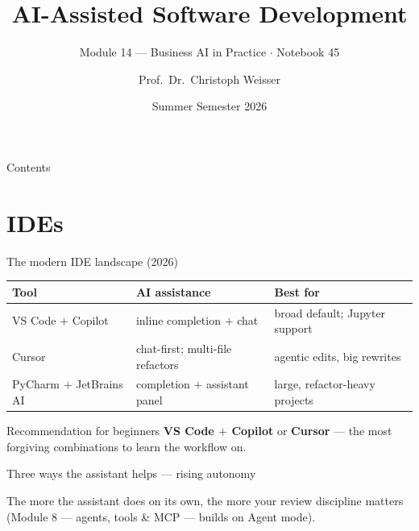 \documentclass[aspectratio=169,11pt]{beamer}
\title{AI-Assisted Software Development}
\subtitle{Module 14 --- Business AI in Practice $\cdot$ Notebook 45}
\author{Prof.\ Dr.\ Christoph Weisser}
\institute{HSBI}
\date{Summer Semester 2026}
\begin{document}
\begin{frame}\titlepage\end{frame}

\begin{frame}{Contents}
  \tableofcontents[hideallsubsections]
\end{frame}

\section{IDEs}
\begin{frame}{The modern IDE landscape (2026)}
  \small
  \begin{center}
  \begin{tabular}{lp{4.4cm}p{3.6cm}}
    \toprule
    \textbf{Tool} & \textbf{AI assistance} & \textbf{Best for} \\
    \midrule
    VS Code $+$ Copilot & inline completion $+$ chat & broad default; Jupyter support \\
    Cursor              & chat-first; multi-file refactors & agentic edits, big rewrites \\
    PyCharm $+$ JetBrains AI & completion $+$ assistant panel & large, refactor-heavy projects \\
    \bottomrule
  \end{tabular}
  \end{center}
  \begin{exampleblock}{Recommendation for beginners}
    \textbf{VS Code $+$ Copilot} or \textbf{Cursor} --- the most forgiving combinations to learn the workflow on.
  \end{exampleblock}
\end{frame}

\begin{frame}{Three ways the assistant helps --- rising autonomy}
  \begin{center}
  \end{center}
  {\footnotesize The more the assistant does on its own, the more your review discipline matters (Module 8 --- agents, tools \& MCP --- builds on Agent mode).}
\end{frame}
\end{document}
